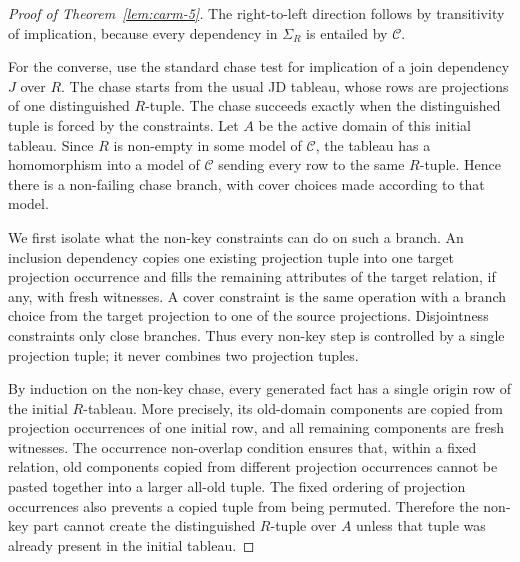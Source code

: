 \documentclass[10pt]{article}
\begin{document}
\begin{proof}[Proof of Theorem~\ref{lem:carm-5}]
The right-to-left direction follows by transitivity of implication,
because every dependency in \(\Sigma_R\) is entailed by
\(\mathcal C\).

For the converse, use the standard chase test for implication of a join
dependency \(J\) over \(R\).  The chase starts from the usual JD tableau,
whose rows are projections of one distinguished \(R\)-tuple.  The chase
succeeds exactly when the distinguished tuple is forced by the
constraints.  Let \(A\) be the active domain of this initial tableau.
Since \(R\) is non-empty in some model of \(\mathcal C\), the tableau has
a homomorphism into a model of \(\mathcal C\) sending every row to the
same \(R\)-tuple.  Hence there is a non-failing chase branch, with cover
choices made according to that model.

We first isolate what the non-key constraints can do on such a branch.
An inclusion dependency copies one existing projection tuple into one
target projection occurrence and fills the remaining attributes of the
target relation, if any, with fresh witnesses.  A cover constraint is the
same operation with a branch choice from the target projection to one of
the source projections.  Disjointness constraints only close branches.
Thus every non-key step is controlled by a single projection tuple; it
never combines two projection tuples.

By induction on the non-key chase, every generated fact has a single
origin row of the initial \(R\)-tableau.  More precisely, its old-domain
components are copied from projection occurrences of one initial row, and
all remaining components are fresh witnesses.  The occurrence
non-overlap condition ensures that, within a fixed relation, old
components copied from different projection occurrences cannot be pasted
together into a larger all-old tuple.  The fixed ordering of projection
occurrences also prevents a copied tuple from being permuted.  Therefore
the non-key part cannot create the distinguished \(R\)-tuple over \(A\)
unless that tuple was already present in the initial tableau.


\end{proof}
\end{document}
